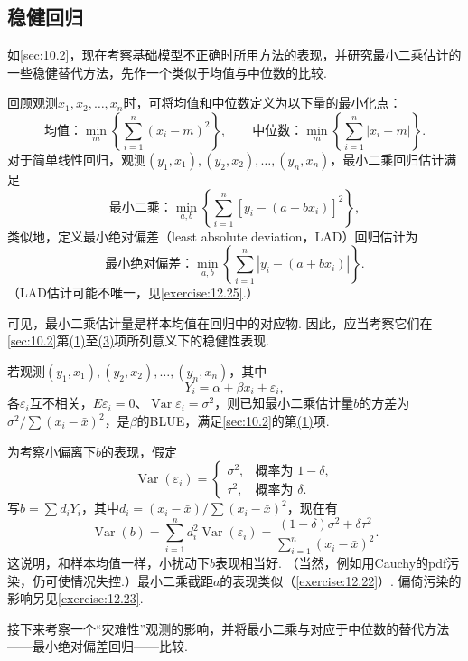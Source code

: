 \subsection{稳健回归}\label{sec:12.4}
如\autoref{sec:10.2}，现在考察基础模型不正确时所用方法的表现，并研究最小二乘估计的一些稳健替代方法，先作一个类似于均值与中位数的比较.

回顾观测$x_1,x_2,\ldots,x_n$时，可将均值和中位数定义为以下量的最小化点：
$$\text{均值：}\min_m\left\{\sum_{i=1}^n(x_i-m)^2\right\},\qquad
\text{中位数：}\min_m\left\{\sum_{i=1}^n|x_i-m|\right\}.$$
对于简单线性回归，观测$(y_1,x_1),\allowbreak(y_2,x_2),\allowbreak\ldots,\allowbreak(y_n,x_n)$，最小二乘回归估计满足
$$\text{最小二乘：}\min_{a,b}\left\{\sum_{i=1}^n[y_i-(a+bx_i)]^2\right\},$$
类似地，定义最小绝对偏差（least absolute deviation，LAD）回归估计为
$$\text{最小绝对偏差：}\min_{a,b}\left\{\sum_{i=1}^n|y_i-(a+bx_i)|\right\}.$$
（LAD估计可能不唯一，见\autoref{exercise:12.25}.）

可见，最小二乘估计量是样本均值在回归中的对应物. 因此，应当考察它们在\autoref{sec:10.2}第\hyperref[item:10.2.huber.1]{(1)}至\hyperref[item:10.2.huber.3]{(3)}项所列意义下的稳健性表现.

\begin{example}[最小二乘估计的稳健性]\label{ex:12.4.1}
若观测$(y_1,x_1),\allowbreak(y_2,x_2),\allowbreak\ldots,\allowbreak(y_n,x_n)$，其中
$$Y_i=\alpha+\beta x_i+\varepsilon_i,$$
各$\varepsilon_i$互不相关，$E\varepsilon_i=0$、$\operatorname{Var}\varepsilon_i=\sigma^2$，则已知最小二乘估计量$b$的方差为$\sigma^2/\sum(x_i-\bar x)^2$，是$\beta$的BLUE，满足\autoref{sec:10.2}的第\hyperref[item:10.2.huber.1]{(1)}项.

为考察小偏离下$b$的表现，假定
$$\operatorname{Var}(\varepsilon_i)=\begin{cases}\sigma^2,&\text{概率为 }1-\delta,\\\tau^2,&\text{概率为 }\delta.\end{cases}$$
写$b=\sum d_iY_i$，其中$d_i=(x_i-\bar x)/\sum(x_i-\bar x)^2$，现在有
$$\operatorname{Var}(b)=\sum_{i=1}^nd_i^2\operatorname{Var}(\varepsilon_i)
=\frac{(1-\delta)\sigma^2+\delta\tau^2}{\sum_{i=1}^n(x_i-\bar x)^2}.$$
这说明，和样本均值一样，小扰动下$b$表现相当好. （当然，例如用Cauchy的pdf污染，仍可使情况失控.）最小二乘截距$a$的表现类似（\autoref{exercise:12.22}）. 偏倚污染的影响另见\autoref{exercise:12.23}.
\end{example}

接下来考察一个“灾难性”观测的影响，并将最小二乘与对应于中位数的替代方法——最小绝对偏差回归——比较.

